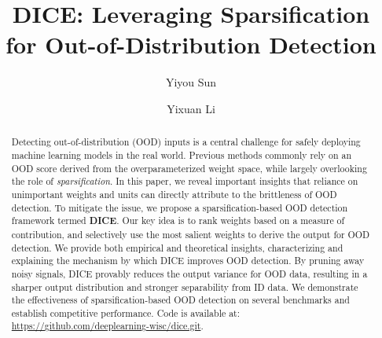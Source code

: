 \documentclass[runningheads]{llncs}
\begin{document}
\pagestyle{headings}
\mainmatter
\def\ECCVSubNumber{4405}  


\begin{comment}
\titlerunning{ECCV-22 submission ID \ECCVSubNumber} 
\authorrunning{ECCV-22 submission ID \ECCVSubNumber} 
\author{Anonymous ECCV submission}
\institute{Paper ID \ECCVSubNumber}
\end{comment}



\title{DICE: Leveraging Sparsification for Out-of-Distribution Detection} 




\author{Yiyou Sun \and
Yixuan Li}


\maketitle

\begin{abstract}
Detecting out-of-distribution (OOD) inputs is a central challenge for safely deploying machine learning models in the real world. Previous methods commonly rely on an OOD score derived from the overparameterized weight space, while largely overlooking the role of \emph{sparsification}. In this paper, we reveal important insights that reliance on unimportant weights and units can directly attribute to the brittleness of OOD detection. To mitigate the issue, we propose a sparsification-based OOD detection framework termed \textbf{DICE}. Our key idea is to rank weights based on a measure of contribution, and selectively use the most salient weights to derive the output for OOD detection. We provide both empirical and theoretical insights, characterizing and explaining the mechanism by which DICE improves OOD detection. By pruning away noisy signals, DICE provably reduces the output variance for OOD data, resulting in a sharper output distribution and stronger separability from ID data. We demonstrate the effectiveness of
sparsification-based OOD detection on several
benchmarks and establish competitive performance.
Code is available at:  \url{https://github.com/deeplearning-wisc/dice.git}.

\end{abstract}
\end{document}
